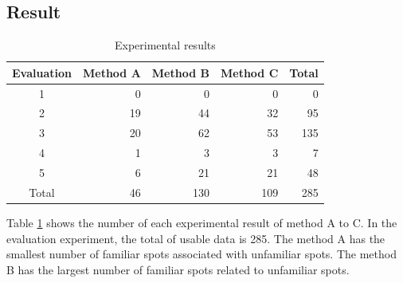 \documentclass[journal]{IAENGtran}
\begin{document}
\subsection{Result}
\label{subsec:Result}
\begin{table}[t]
  \caption{Experimental results}
  \label{table:Experimental results}
  \centering
  \begin{tabular}{c|r|r|r|r}
  \hline
  Evaluation & \multicolumn{1}{c|}{Method A} & \multicolumn{1}{c|}{Method B} & \multicolumn{1}{c|}{Method C} &  \multicolumn{1}{c}{Total} \\ \hline
  1  & 0                      & 0                      & 0                      & 0                      \\
  2  & 19                     & 44                     & 32                     & 95                    \\
  3  & 20                     & 62                     & 53                     & 135                    \\
  4  & 1                      & 3                      & 3                      & 7                     \\
  5  & 6                      & 21                     & 21                     & 48                     \\ \hline
  Total & 46                     & 130                    & 109                    & 285                    \\ \hline
  \end{tabular}
\end{table}

Table \ref{table:Experimental results} shows the number of each experimental result of method A to C.
In the evaluation experiment, the total of usable data is 285.
The method A has the smallest number of familiar spots associated with unfamiliar spots.
The method B has the largest number of familiar spots related to unfamiliar spots.
\end{document}
